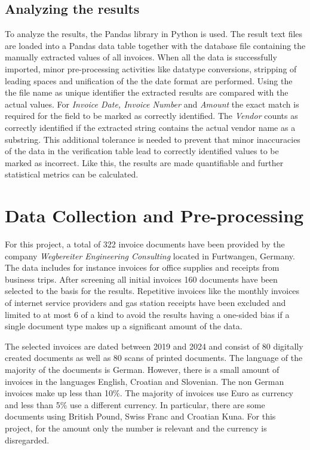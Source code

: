 \subsection{Analyzing the results}
To analyze the results, the Pandas library in Python is used. The result text files are loaded into a Pandas data table together with the database file
containing the manually extracted values of all invoices. When all the data is successfully imported, minor pre-processing activities like datatype conversions, stripping of leading spaces and unification of the the date format are performed.
Using the the file name as unique identifier the extracted results are compared with the actual values. For \textit{Invoice Date, Invoice Number}
and \textit{Amount} the exact match is required for the field to be marked as correctly identified. 
The \textit{Vendor} counts as correctly identified if the extracted string contains the actual vendor name as a substring. This additional tolerance is needed to prevent that minor inaccuracies of the data in the verification table lead to correctly identified values to be marked as incorrect.
Like this, the results are made quantifiable and further statistical metrics can be calculated.

\newpage
\section{Data Collection and Pre-processing}
For this project, a total of 322 invoice documents have been provided by the company \textit{Wegbereiter Engineering Consulting} located in Furtwangen, Germany. The data includes for instance invoices for office supplies and receipts from business trips. After screening all initial invoices 160 documents have been selected to the basis for the results. Repetitive invoices like the monthly invoices of internet service providers and gas station receipts have been excluded and limited to at most 6 of a kind to avoid the results having a one-sided bias if a single document type makes up a significant amount of the data.

The selected invoices are dated between 2019 and 2024 and consist of 80 digitally created documents as well as 80 scans of printed documents. 
The language of the majority of the documents is German. However, there is a small amount of invoices in the languages English, Croatian and Slovenian. The non German invoices make up less than 10\%.
The majority of invoices use Euro as currency and less than 5\% use a different currency. In particular, there are some documents using British Pound, Swiss Franc and Croatian Kuna. For this project, for the amount only the number is relevant and the currency is disregarded.

